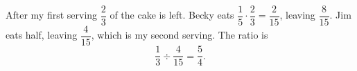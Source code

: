 After my first serving \(\dfrac{2}{3}\) of the cake is left. Becky eats \(\dfrac{1}{5}\cdot\dfrac{2}{3}=\dfrac{2}{15}\), leaving \(\dfrac{8}{15}\). Jim eats half, leaving \(\dfrac{4}{15}\), which is my second serving. The ratio is
\[
\dfrac{1}{3}\div\dfrac{4}{15}=\boxed{\dfrac{5}{4}}.
\]
